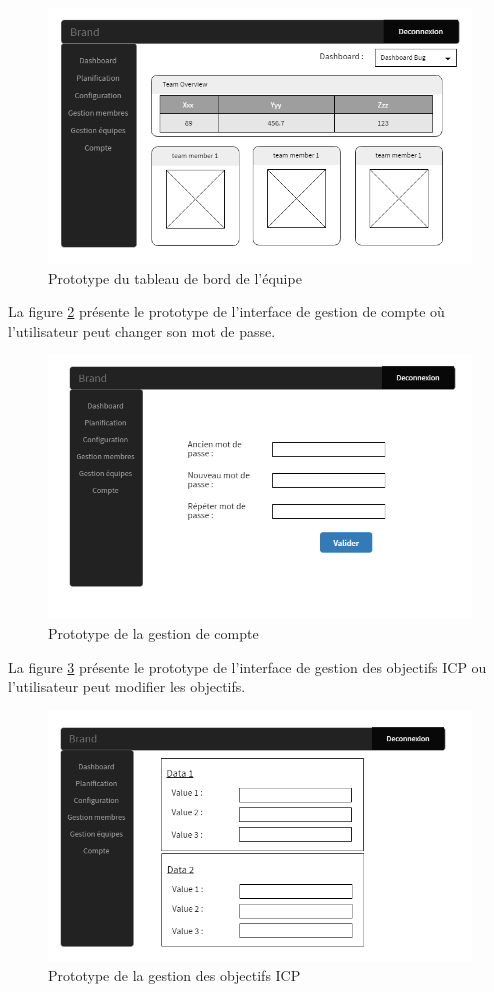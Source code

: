 \begin{figure}[H]
  \centering
  \includegraphics[scale=0.74]{figures/prototypes/Team_dashboard.PNG}
  \caption{Prototype du tableau de bord de l'équipe}
  \label{code12}
\end{figure}
La figure \ref{code13} présente le prototype de l'interface de gestion de compte où l'utilisateur peut changer son mot de passe.
\begin{figure}[H]
  \centering
  \includegraphics[scale=0.74]{figures/prototypes/Compte.PNG}
  \caption{Prototype de la gestion de compte}
  \label{code13}
\end{figure}
La figure \ref{code14} présente le prototype de l'interface de gestion des objectifs ICP ou l'utilisateur peut modifier les objectifs.
\begin{figure}[H]
  \centering
  \includegraphics[scale=0.74]{figures/prototypes/Configuration.PNG}
  \caption{Prototype de la gestion des objectifs ICP}
  \label{code14}
\end{figure}
